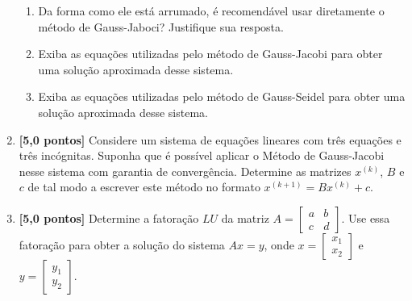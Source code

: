 \documentclass[12pt,a4paper]{article}
\begin{document}
\begin{enumerate}
  \begin{enumerate}
   
   \item Da forma como ele está arrumado, é recomendável usar diretamente o método de Gauss-Jaboci? Justifique sua resposta.
   \item Exiba as equações utilizadas pelo método de Gauss-Jacobi para obter uma solução aproximada desse sistema.
   \item Exiba as equações utilizadas pelo método de Gauss-Seidel para obter uma solução aproximada desse sistema.
  \end{enumerate}

 \item \textbf{[5,0 pontos]} Considere um sistema de equações lineares com três equações e três incógnitas. Suponha que é possível aplicar o 
Método de Gauss-Jacobi nesse sistema com garantia de convergência. Determine as matrizes $x^{(k)}$, $B$ e $c$ de tal modo a escrever este método 
no formato $x^{(k+1)} = Bx^{(k)} + c$.

 \item \textbf{[5,0 pontos]} Determine a fatoração $LU$ da matriz $A = \begin{bmatrix} a & b \\ c & d\end{bmatrix}$. Use essa fatoração para obter 
a solução do sistema $Ax = y$, onde $x = \begin{bmatrix} x_1 \\ x_2 \end{bmatrix}$ e $y = \begin{bmatrix} y_1 \\ y_2\end{bmatrix}$.

\end{enumerate}
\end{document}
